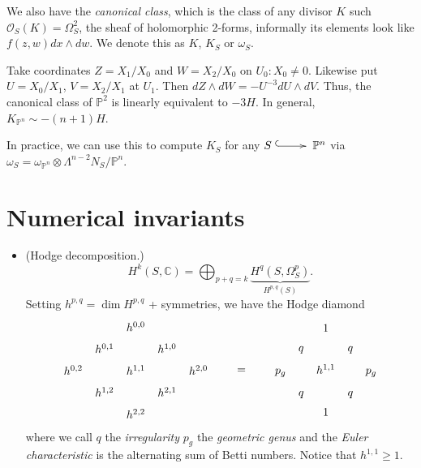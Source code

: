 We also have the {\it canonical class},
which is the class of any divisor $K$
such $\mathcal{O}_S(K)=\Omega^2_S$,
the sheaf of holomorphic 2-forms,
informally its elements look like
$f(z,w)dx\wedge dw$.
We denote this as $K$,  $K_S$ or $\omega_S$.

\begin{example}
\label{example-canonical-class}
Take coordinates $Z=X_1/X_0$ and $W=X_2/X_0$
on $U_0: X_0 \neq 0$.
Likewise put $U=X_0/X_1$, $V=X_2/X_1$ at
$U_1$.
Then $dZ\wedge dW=-U^{-3}dU\wedge dV$.
Thus, the canonical class of $\mathbb{P}^2$
is linearly equivalent to $-3H$.
In general, $K_{\mathbb{P}^n}\sim -(n+1)H$.

In practice, we can use this to compute $K_S$
for any  $S \xymatrix{\ar@{^{(}->}[r]&}
\mathbb{P}^n$
via $\omega_S=\omega_{\mathbb{P}^n}\otimes
\Lambda^{n-2}N_S/\mathbb{P}^n$.
\end{example}


\section{Numerical invariants}
\label{section-numerical-invariants}

\begin{itemize}
\item (Hodge decomposition.)
$$
H^k(S,\mathbb{C})=\bigoplus_{p+q=k}
\underbrace{H^q(S,\Omega^p_S)}_{
H^{p,q}(S)}.
$$
Setting $h^{p,q}=\dim H^{p,q}$ + symmetries,
we have the Hodge diamond
$$
\begin{aligned}\xymatrix@C=.5em@R=.5em{
&  &   h^{0,0}\\
&  h^{0,1}&  &  h^{1,0}\\
h^{0,2}&&  h^{1,1}&  &  h^{2,0}\\
&  h^{1,2}&  &  h^{2,1}\\
&  &  h^{2,2}
}\end{aligned}
\qquad =\qquad
\begin{aligned}\xymatrix@C=.5em@R=.5em{&  &
1\\
&  q&  &  q\\
p_g&&  h^{1,1}&  &  p_g\\
&  q&  &  q\\
&  &  1
}\end{aligned}
$$
where we call $q$ the {\it irregularity}
$p_g$ the {\it geometric genus}
and the {\it Euler characteristic}
is the alternating sum of Betti numbers.
Notice that $h^{1,1}\geq 1$.
\end{itemize}

